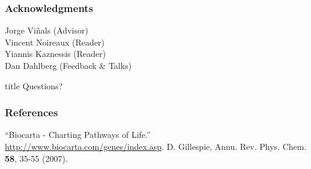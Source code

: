\documentclass[xcolor={usenames,dvipsnames,svgnames}]{beamer}
\begin{document}
\begin{frame}
    \frametitle{Acknowledgments}
    Jorge Viñals (Advisor)\\[2ex]

    Vincent Noireaux (Reader)\\
    Yiannis Kaznessis (Reader)\\[2ex]

    Dan Dahlberg (Feedback \& Talks)
\end{frame}

\begin{frame}[plain]

\hfill
    \begin{beamercolorbox}[rounded=true, center, shadow=true,wd=6cm]{title}
        \huge Questions?
    \end{beamercolorbox}
\hfill\hfill

\end{frame}

\appendix

\begin{frame}
    \frametitle{References}
    \begin{thebibliography}{9}
         ``Biocarta - Charting Pathways of Life.'' \url{http://www.biocarta.com/genes/index.asp}.
         D. Gillespie, Annu. Rev. Phys. Chem. \textbf{58}, 35-55 (2007).
        
    \end{thebibliography}
\end{frame}
\end{document}
